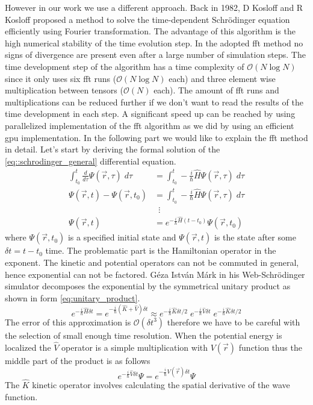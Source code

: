 However in our work we use a different approach.
Back in 1982, D Kosloff and R Kosloff proposed a method \cite{KOSLOFF198335} to solve the time-dependent Schrödinger equation efficiently using Fourier transformation.
The advantage of this algorithm is the high numerical stability of the time evolution step.
In the adopted \acrshort{fft} method no signs of divergence are present even after a large number of simulation steps.
The time development step of the algorithm has a time complexity of $\mathcal{O}(N\log N)$ since it only uses six \acrshort{fft} runs ($\mathcal{O}(N\log N)$ each) and three element wise multiplication between tensors ($\mathcal{O}(N)$ each).
The amount of \acrshort{fft} runs and multiplications can be reduced further if we don't want to read the results of the time development in each step.
A significant speed up can be reached by using parallelized implementation of the \acrshort{fft} algorithm as we did by using an efficient \acrshort{gpu} implementation.
In the following part we would like to explain the \acrshort{fft} method in detail.
Let's start by deriving the formal solution of the \ref{eq::schrodinger_general} differential equation.
\begin{equation}
	\label{eq:formal_solution}
	\begin{split}
		\int_{t_0}^t \frac{d}{d\tau}\Psi(\vec{r}, \tau) \; d\tau &= \int_{t_0}^t -\frac{i}{\hbar}\hat{H}\Psi(\vec{r}, \tau)\; d\tau\\
		\Psi(\vec{r}, t) - \Psi(\vec{r}, t_0) &= \int_{t_0}^t -\frac{i}{\hbar}\hat{H}\Psi(\vec{r}, \tau)\; d\tau\\
		&\;\:\vdots\\
		\Psi(\vec{r}, t) &= e^{-\frac{i}{\hbar}\hat{H}(t - t_0)} \Psi(\vec{r}, t_0)
	\end{split}
\end{equation}
where $\Psi(\vec{r}, t_0)$ is a specified initial state and $\Psi(\vec{r}, t)$ is the state after some $\delta t = t - t_0$ time.
The problematic part is the Hamiltonian operator in the exponent.
The kinetic and potential operators can not be commuted in general, hence exponential can not be factored.
Géza István Márk in his Web-Schrödinger simulator \cite{mark2020webschrodinger} decomposes the exponential by the symmetrical unitary product as shown in form \ref{eq:unitary_product}.
\begin{equation}
	\label{eq:unitary_product}
	e^{-\frac{i}{\hbar}\hat{H}\delta t} = e^{-\frac{i}{\hbar}(\hat{K} + \hat{V})\delta t} \approx e^{-\frac{i}{\hbar}\hat{K}\delta t / 2}\; e^{-\frac{i}{\hbar}\hat{V}\delta t}\; e^{-\frac{i}{\hbar}\hat{K}\delta t / 2}
\end{equation}
The error of this approximation is $\mathcal{O}(\delta t^3)$ therefore we have to be careful with the selection of small enough time resolution.
When the potential energy is localized the $\hat{V}$ operator is a simple multiplication with $V(\vec{r})$ function thus the middle part of the product is as follows
\begin{equation}
	\label{eq:potential_prop}
	e^{-\frac{i}{\hbar}\hat{V}\delta t} \Psi = e^{-\frac{i}{\hbar}V(\vec{r})\delta t} \Psi
\end{equation}
The $\hat{K}$ kinetic operator involves calculating the spatial derivative of the wave function.

